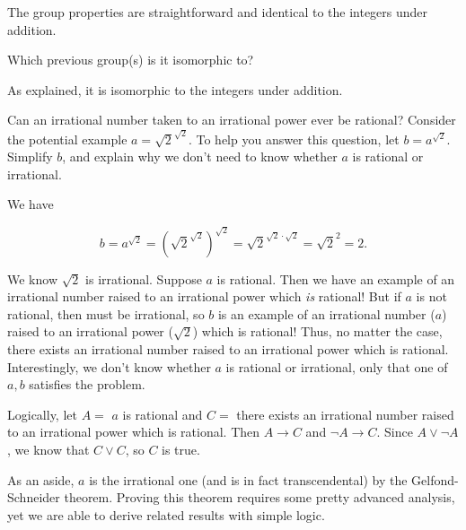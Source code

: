 \documentclass[../key.tex]{subfiles}
\begin{document}
The group properties are straightforward and identical to the integers under addition.

\begin{iinner_problem}
\item Which previous group(s) is it isomorphic to?
\end{iinner_problem}

\noindent As explained, it is isomorphic to the integers under addition.

\begin{outer_problem}
\item Can an irrational number taken to an irrational power ever be rational? Consider the potential example $a = \sqrt{2}^{\sqrt{2}}$. To help you answer this question, let $b = a^{\sqrt{2}}$. Simplify $b$, and explain why we don’t need to know whether $a$ is rational or irrational.
\end{outer_problem}

\noindent We have

$$b = a^{\sqrt{2}} = \left(\sqrt{2}^{\sqrt{2}}\right)^{\sqrt{2}} = \sqrt{2} ^ {\sqrt{2}\cdot \sqrt{2}} = \sqrt{2}^2 = 2.$$

\noindent We know $\sqrt{2}$ is irrational. Suppose $a$ is rational. Then we have an example of an irrational number raised to an irrational power which \textit{is} rational! But if $a$ is not rational, then must be irrational, so $b$ is an example of an irrational number ($a$) raised to an irrational power ($\sqrt{2}$) which is rational! Thus, no matter the case, there exists an irrational number raised to an irrational power which is rational. Interestingly, we don't know whether $a$ is rational or irrational, only that one of $a,b$ satisfies the problem.

Logically, let $A=$ $a$ is rational and $C=$ there exists an irrational number raised to an irrational power which is rational. Then $A\to C$ and $\lnot A\to C$. Since $A \lor \lnot A$, we know that $C\lor C$, so $C$ is true.

As an aside, $a$ is the irrational one (and is in fact transcendental) by the Gelfond-Schneider theorem. Proving this theorem requires some pretty advanced analysis, yet we are able to derive related results with simple logic.
\end{document}
